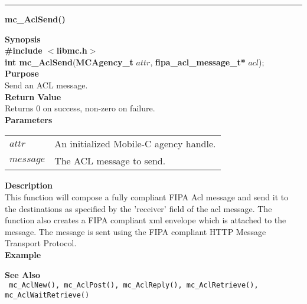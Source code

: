 \noindent
\vspace{5pt}
\rule{6.5in}{0.015in}
\noindent
{}
{\LARGE \bf mc\_AclSend()}\\
\label{api:mc_AclSend()}

\noindent
{\bf Synopsis}\\
{\bf \#include $<$libmc.h$>$}\\
{\bf int mc\_AclSend}({\bf MCAgency\_t} $attr$, {\bf fipa\_acl\_message\_t*} $acl$);\\

\noindent
{\bf Purpose}\\
Send an ACL message.\\

\noindent
{\bf Return Value}\\
Returns 0 on success, non-zero on failure.\\

\noindent
{\bf Parameters}
\vspace{-0.1in}
\begin{description}
\item
\begin{tabular}{p{10 mm}p{145 mm}} 
$attr$ & An initialized Mobile-C agency handle.\\
$message$ & The ACL message to send. 
\end{tabular}
\end{description}

\noindent
{\bf Description}\\
This function will compose a fully compliant FIPA Acl message
and send it to the destinations as specified by the 'receiver' field of
the acl message. The function also creates a FIPA compliant
xml envelope which is attached to the message. The message is sent
using the FIPA compliant HTTP Message Transport Protocol.\\

\noindent
{\bf Example}\\
\noindent
{\footnotesize }

\noindent
{\bf See Also}\\
\texttt{
  mc\_AclNew(), mc\_AclPost(), mc\_AclReply(), mc\_AclRetrieve(), 
    \linebreak mc\_AclWaitRetrieve()
}

